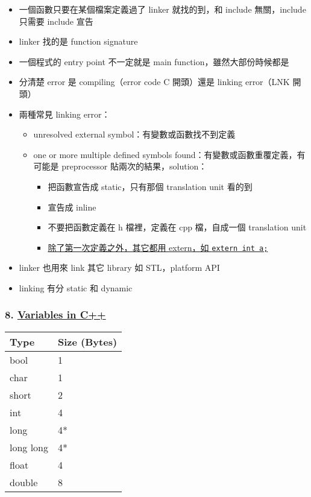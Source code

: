 \documentclass[11pt]{article}
\providecommand{\tightlist}{%
      \setlength{\itemsep}{0pt}\setlength{\parskip}{0pt}}
\begin{document}
\begin{itemize}
\tightlist
\item
  一個函數只要在某個檔案定義過了 linker 就找的到，和 include
  無關，include 只需要 include 宣告
\item
  linker 找的是 function signature
\item
  一個程式的 entry point 不一定就是 main function，雖然大部份時候都是
\item
  分清楚 error 是 compiling（error code C 開頭）還是 linking error（LNK
  開頭）
\item
  兩種常見 linking error：

  \begin{itemize}
  \tightlist
  \item
    unresolved external symbol：有變數或函數找不到定義
  \item
    one or more multiple defined symbols
    found：有變數或函數重覆定義，有可能是 preprocessor
    貼兩次的結果，solution：

    \begin{itemize}
    \tightlist
    \item
      把函數宣告成 static，只有那個 translation unit 看的到
    \item
      宣告成 inline
    \item
      不要把函數定義在 h 檔裡，定義在 cpp 檔，自成一個 translation unit
    \item
      \href{https://youtu.be/f3FVU-iwNuA?list=PLlrATfBNZ98dudnM48yfGUldqGD0S4FFb\&t=150}{除了第一次定義之外，其它都用
      extern，如 \texttt{extern\ int\ a;}}
    \end{itemize}
  \end{itemize}
\item
  linker 也用來 link 其它 library 如 STL，platform API
\item
  linking 有分 static 和 dynamic
\end{itemize}

\hypertarget{variables-in-c}{%
\subsubsection{\texorpdfstring{8.
\href{https://www.youtube.com/watch?v=zB9RI8_wExo\&list=PLlrATfBNZ98dudnM48yfGUldqGD0S4FFb\&index=8}{Variables
in C++}}{8. Variables in C++}}\label{variables-in-c}}

\begin{longtable}[]{@{}ll@{}}
\toprule
Type & Size (Bytes)\tabularnewline
\midrule
\endhead
bool & 1\tabularnewline
char & 1\tabularnewline
short & 2\tabularnewline
int & 4\tabularnewline
long & 4*\tabularnewline
long long & 4*\tabularnewline
float & 4\tabularnewline
double & 8\tabularnewline
\bottomrule
\end{longtable}
\end{document}
